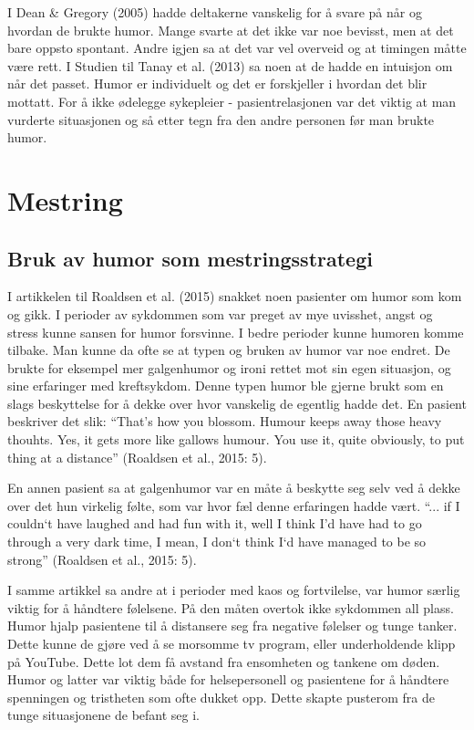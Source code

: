 I Dean \&{} Gregory (2005) hadde deltakerne vanskelig for å svare på når og
hvordan de brukte humor. Mange svarte at det ikke var noe bevisst, men at det
bare oppsto spontant. Andre igjen sa at det var vel overveid og at timingen
måtte være rett. I Studien til Tanay et al. (2013) sa noen at de hadde en
intuisjon om når det passet. Humor er individuelt og det er forskjeller i
hvordan det blir mottatt. For å ikke ødelegge sykepleier - pasientrelasjonen
var det viktig at man vurderte situasjonen og så etter tegn fra den andre
personen før man brukte humor.

\section{Mestring}

\subsection{Bruk av humor som mestringsstrategi}

I artikkelen til Roaldsen et al. (2015) snakket noen pasienter om humor som kom
og gikk. I perioder av sykdommen som var preget av mye uvisshet, angst og
stress kunne sansen for humor forsvinne. I bedre perioder kunne humoren komme
tilbake. Man kunne da ofte se at typen og bruken av humor var noe endret. De
brukte for eksempel mer galgenhumor og ironi rettet mot sin egen situasjon, og
sine erfaringer med kreftsykdom. Denne typen humor ble gjerne brukt som en
slags beskyttelse for å dekke over hvor vanskelig de egentlig hadde det. En
pasient beskriver det slik: “That’s how you blossom. Humour keeps away those
heavy thouhts. Yes, it gets more like gallows humour. You use it, quite
obviously, to put thing at a distance” (Roaldsen et al., 2015: 5).

En annen pasient sa at galgenhumor var en måte å beskytte seg selv ved å dekke
over det hun virkelig følte, som var hvor fæl denne erfaringen hadde vært. “...
if I couldn`t have laughed and had fun with it, well I think I’d have had to go
through a very dark time, I mean, I don`t think I`d have managed to be so
strong” (Roaldsen et al., 2015: 5).

I samme artikkel sa andre at i perioder med kaos og fortvilelse, var humor
særlig viktig for å håndtere følelsene. På den måten overtok ikke sykdommen all
plass. Humor hjalp pasientene til å distansere seg fra negative følelser og
tunge tanker. Dette kunne de gjøre ved å se morsomme tv program, eller
underholdende klipp på YouTube. Dette lot dem få avstand fra ensomheten og
tankene om døden. Humor og latter var viktig både for helsepersonell og
pasientene for å håndtere spenningen og tristheten som ofte dukket opp. Dette
skapte pusterom fra de tunge situasjonene de befant seg i.

